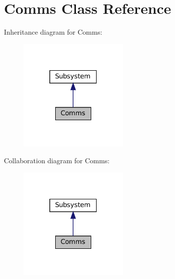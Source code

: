 \hypertarget{class_comms}{}\section{Comms Class Reference}
\label{class_comms}


Inheritance diagram for Comms\+:\nopagebreak
\begin{figure}[H]
\begin{center}
\leavevmode
\includegraphics[width=151pt]{class_comms__inherit__graph}
\end{center}
\end{figure}


Collaboration diagram for Comms\+:\nopagebreak
\begin{figure}[H]
\begin{center}
\leavevmode
\includegraphics[width=151pt]{class_comms__coll__graph}
\end{center}
\end{figure}
